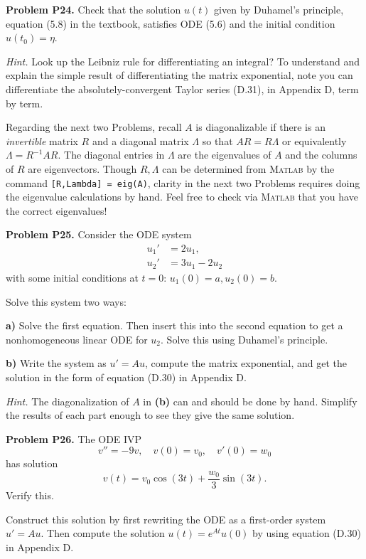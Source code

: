 \documentclass[12pt]{amsart}
\newcommand{\Matlab}{\textsc{Matlab}\xspace}
\newcommand{\prob}[1]{\bigskip\noindent\textbf{#1}\quad }
\newcommand{\epart}[1]{\medskip\noindent\textbf{#1)}\quad }
\begin{document}
\bigskip
\prob{Problem P24.}  Check that the solution $u(t)$ given by Duhamel's principle, equation (5.8) in the textbook, satisfies ODE (5.6) and the initial condition $u(t_0)=\eta$.

\medskip
\noindent \emph{Hint.}  Look up the Leibniz rule for differentiating an integral?  To understand and explain the simple result of differentiating the matrix exponential, note you can differentiate the absolutely-convergent Taylor series (D.31), in Appendix D, term by term.


\clearpage \newpage
Regarding the next two Problems, recall $A$ is diagonalizable if there is an \emph{invertible} matrix $R$ and a diagonal matrix $\Lambda$ so that $AR = R\Lambda$ or equivalently $\Lambda = R^{-1} A R$.  The diagonal entries in $\Lambda$ are the eigenvalues of $A$ and the columns of $R$ are eigenvectors.  Though $R,\Lambda$ can be determined from \Matlab by the command \texttt{[R,Lambda] = eig(A)}, clarity in the next two Problems requires doing the eigenvalue calculations by hand.  Feel free to check via \Matlab that you have the correct eigenvalues!

\medskip
\prob{Problem P25.}  Consider the ODE system
\begin{align*}
u_1' &= 2 u_1, \\
u_2' &= 3 u_1 - 2 u_2
\end{align*}
with some initial conditions at $t=0$: $u_1(0) = a, u_2(0) = b$.

Solve this system two ways:

\epart{a} Solve the first equation.  Then insert this into the second equation to get a nonhomogeneous linear ODE for $u_2$.  Solve this using Duhamel's principle.

\epart{b} Write the system as $u'=Au$, compute the matrix exponential, and get the solution in the form of equation (D.30) in Appendix D.

\medskip
\noindent \emph{Hint.}  The diagonalization of $A$ in \textbf{(b)} can and should be done by hand.  Simplify the results of each part enough to see they give the same solution.

\prob{Problem P26.}  The ODE IVP
    $$v'' = - 9 v, \quad v(0) = v_0, \quad v'(0) = w_0$$
has solution
    $$v(t) = v_0 \cos(3 t) + \frac{w_0}{3} \sin(3t).$$
Verify this.

Construct this solution by first rewriting the ODE as a first-order system $u' = A u$.  Then compute the solution $u(t) = e^{At} u(0)$ by using equation (D.30) in Appendix D.
\end{document}

